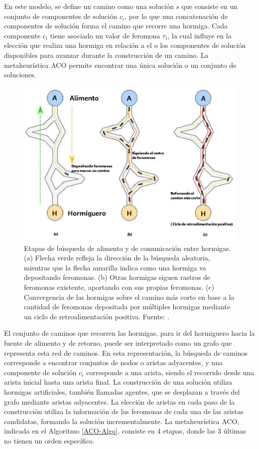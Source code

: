 En este modelo, se define un camino como una soluci\'on $s$ que consiste en un conjunto de componentes de soluci\'on $c_{i}$, por lo que una concatenaci\'on de componentes de soluci\'on forma el camino que recorre una hormiga. Cada componente $c_{i}$ tiene asociado un valor de feromona $\tau_i$, la cual influye en la elecci\'on que realiza una hormiga en relaci\'on a el o los componentes de soluci\'on disponibles para avanzar durante la construcci\'on de un camino. La metaheur\'istica ACO permite encontrar una \'unica soluci\'on o un conjunto de soluciones. 


\begin{figure}[h]
    \centering
    \includegraphics[scale=0.5]{imagenes/ACO-ant.png}
    \caption{Etapas de b\'usqueda de alimento y de comunicaci\'on entre hormigas. (a) Flecha verde refleja la direcci\'on de la  b\'usqueda aleatoria, mientras que la flecha amarilla indica como una hormiga va depositando feromonas. (b) Otras hormigas siguen rastros de feromonas existente, aportando con sus propias feromonas. (c) Convergencia de las hormigas sobre el camino m\'as corto en base a la cantidad de feromonas depositada por m\'ultiples hormigas mediante un ciclo de retroalimentaci\'on positiva. Fuente: \cite{liu2020improving}.}
    \label{fig:hormigas}
\end{figure}

El conjunto de caminos que recorren las hormigas, para ir del hormiguero hacia la fuente de alimento y de retorno, puede ser interpretado como un grafo que representa esta red de caminos. En esta representaci\'on, la b\'usqueda de caminos corresponde a encontrar conjuntos de nodos o aristas adyacentes, y una componente de soluci\'on $c_{i}$ corresponde a una arista, siendo el recorrido desde una arista inicial hasta una arista final. La construcci\'on de una soluci\'on utiliza hormigas artificiales, tambi\'en llamadas agentes, que se desplazan a trav\'es del grafo mediante aristas adyacentes. La elecci\'on de aristas en cada paso de la construcci\'on utiliza la informaci\'on de las feromonas de cada una de las aristas candidatas, formando la soluci\'on incrementalmente. La metaheur\'istica ACO, indicada en el Algoritmo \ref{ACO-Algo}, consiste en 4 etapas, donde las 3 \'ultimas no tienen un orden espec\'ifico.


